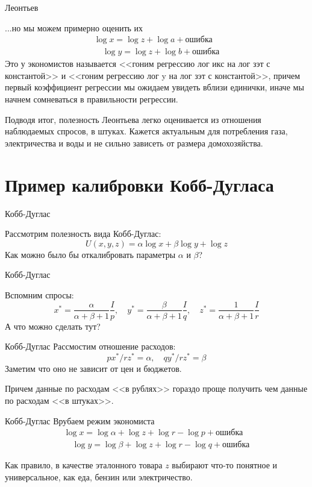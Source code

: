 \documentclass{beamer}
\begin{document}
\begin{frame}{Леонтьев}

...но мы можем примерно оценить их
\begin{gather} \log x = \log z + \log a + \text{ошибка}\\ \quad \log y = \log z + \log b + \text{ошибка}\end{gather}
Это у экономистов называется <<гоним регрессию лог икс на лог зэт с константой>> и <<гоним регрессию лог y на лог зэт с константой>>, причем первый коэффициент регрессии мы ожидаем увидеть вблизи единички, иначе мы начнем сомневаться в правильности регрессии.

Подводя итог, полезность Леонтьева легко оценивается из отношения наблюдаемых спросов, в штуках. Кажется актуальным для потребления газа, электричества и воды и не сильно зависеть от размера домохозяйства.
\end{frame}

\section{Пример калибровки Кобб-Дугласа}

\begin{frame}{Кобб-Дуглас}

Рассмотрим полезность вида Кобб-Дуглас:
$$ U(x,y,z) = \alpha \log x + \beta \log y + \log z$$
Как можно было бы откалибровать параметры $\alpha$ и $\beta$?

\end{frame}

\begin{frame}{Кобб-Дуглас}

Вспомним спросы: 
$$ x^{\ast} = \frac{\alpha}{\alpha + \beta + 1}\frac{I}{p}, \quad y^{\ast} = \frac{\beta}{\alpha + \beta + 1}\frac{I}{q}, \quad z^{\ast} = \frac{1}{\alpha + \beta + 1}\frac{I}{r}$$
А что можно сделать тут?
\end{frame}

\begin{frame}{Кобб-Дуглас}
Рассмостим отношение расходов:
$$ px^{\ast}/rz^{\ast} = \alpha, \quad qy^{\ast}/rz^{\ast} = \beta$$
Заметим что оно не зависит от цен и бюджетов.

Причем данные по расходам <<в рублях>> гораздо проще получить чем данные по расходам <<в штуках>>.

\end{frame}

\begin{frame}{Кобб-Дуглас}
Врубаем режим экономиста
\begin{gather} \log x = \log \alpha + \log z + \log r - \log p + \text{ошибка}\\ \quad \log y = \log \beta + \log z + \log r - \log q + \text{ошибка}\end{gather}

Как правило, в качестве эталонного товара $z$ выбирают что-то понятное и универсальное, как еда, бензин или электричество.
\end{frame}
\end{document}
